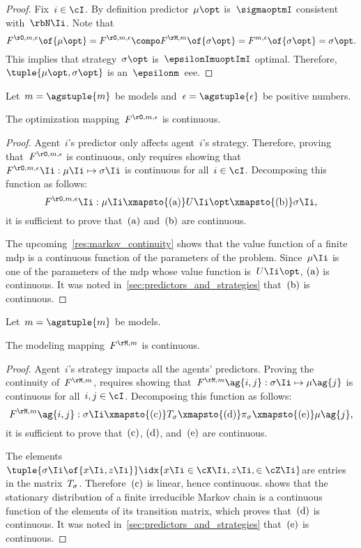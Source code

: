 \begin{proof}
Fix~\(i \in \cI\).
By definition  predictor~\(\mu\opt\) is~\(\sigmaoptmI\) consistent with~\(\rbN\Ii\).
Note that
\[\FOe \of{\mu\opt} = \FOe \compo \FM \of{\sigma\opt} = \FFe \of{\sigma\opt} = \sigma\opt.
\]
This implies that strategy~\(\sigma\opt\) is~\(\epsilonImuoptImI\) optimal.
Therefore, \(\tuple{\mu\opt, \sigma\opt}\) is an~\(\epsilonm\)~\ac{eee}.
\end{proof}

\begin{proposition}
\label{res:optimization_continuity}
Let~\(m = \agstuple{m}\) be models and~\(\epsilon =\agstuple{\epsilon} \) be positive numbers.

The optimization mapping~\(\FOe\) is continuous.
\end{proposition}

\begin{proof}
Agent~\(i\)'s predictor only affects agent~\(i\)'s strategy.
Therefore, proving that~\(\FOe\) is continuous, only requires showing that~\(\FOe\Ii: \mu\Ii \mapsto \sigma\Ii\) is continuous for all~\(i \in \cI\).
Decomposing this function as follows:
\[
\FOe\Ii: \mu\Ii \xmapsto{\subfunc{a}} U\Ii\opt \xmapsto{\subfunc{b}} \sigma\Ii,
\]
it is sufficient to prove that~\(\mathrm{(a)}\) and~\(\mathrm{(b)}\) are continuous.

The upcoming~\cref{res:markov_continuity} shows that the value function of a finite \ac{mdp} is a continuous function of the parameters of the problem.
Since~\(\mu\Ii\) is one of the parameters of the \ac{mdp} whose value function is~\(U\Ii\opt\), \(\mathrm{(a)}\) is continuous.
It was noted in~\cref{sec:predictors_and_strategies} that~\(\mathrm{(b)}\) is continuous.
\end{proof}

\begin{proposition}
\label{res:modeling_continuity}
Let~\(m = \agstuple{m}\) be models.

The modeling mapping~\(\FM\) is continuous.
\end{proposition}

\begin{proof}
Agent~\(i\)'s strategy impacts all the agents' predictors.
Proving the continuity of~\(\FM\), requires showing that~\(\FM\ag{i, j}: \sigma\Ii \mapsto \mu\ag{j}\) is continuous for all~\(i, j \in \cI\).
Decomposing this function as follows:
\[\FM\ag{i, j}: \sigma\Ii \xmapsto{\subfunc{c}} T\strat{\sigma} \xmapsto{\subfunc{d}} \pi\strat{\sigma} \xmapsto{\subfunc{e}} \mu\ag{j},
\]
it is sufficient to prove that~\(\mathrm{(c)}\), \(\mathrm{(d)}\), and~\(\mathrm{(e)}\) are continuous.

The elements~\(\tuple{\sigma\Ii \of{x\Ii, z\Ii}}\idx{x\Ii \in \cX\Ii, z\Ii, \in \cZ\Ii}\)are entries in the matrix~\(T_{\sigma}\).
Therefore~\(\mathrm{(c)}\) is linear, hence continuous.
\cite[Theorem~4.1]{meyer:1980} shows that the stationary distribution of a finite irreducible Markov chain is a continuous function of the elements of its transition matrix, which proves that~\(\mathrm{(d)}\) is continuous.
It was noted in~\cref{sec:predictors_and_strategies} that~\(\mathrm{(e)}\) is continuous.
\end{proof}

